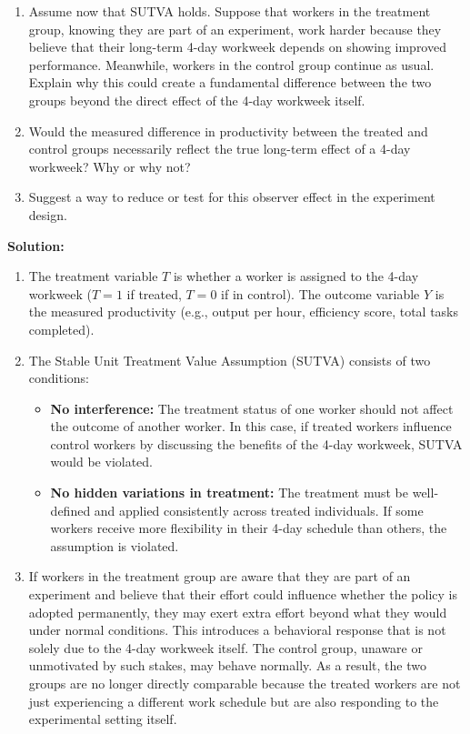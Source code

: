 \documentclass[12pt]{article}
\newif\ifsolutions
\begin{document}
\begin{enumerate}
\begin{enumerate}[label=(\alph*)]
    \item Assume now that SUTVA holds. Suppose that workers in the treatment group, knowing they are part of an experiment, work harder because they believe that their long-term 4-day workweek depends on showing improved performance. Meanwhile, workers in the control group continue as usual. Explain why this could create a fundamental difference between the two groups beyond the direct effect of the 4-day workweek itself.
    
    \item Would the measured difference in productivity between the treated and control groups necessarily reflect the true long-term effect of a 4-day workweek? Why or why not?
    
    \item Suggest a way to reduce or test for this observer effect in the experiment design.
\end{enumerate}

\ifsolutions \color{blue} \textbf{Solution:}  

\begin{enumerate}[label=(\alph*)]  

    \item The treatment variable \( T \) is whether a worker is assigned to the 4-day workweek (\( T = 1 \) if treated, \( T = 0 \) if in control).  
    The outcome variable \( Y \) is the measured productivity (e.g., output per hour, efficiency score, total tasks completed).  

    \item The Stable Unit Treatment Value Assumption (SUTVA) consists of two conditions:  
    \begin{itemize}  
        \item \textbf{No interference:} The treatment status of one worker should not affect the outcome of another worker. In this case, if treated workers influence control workers by discussing the benefits of the 4-day workweek, SUTVA would be violated.
        \item \textbf{No hidden variations in treatment:} The treatment must be well-defined and applied consistently across treated individuals. If some workers receive more flexibility in their 4-day schedule than others, the assumption is violated.  
    \end{itemize}  

    \item If workers in the treatment group are aware that they are part of an experiment and believe that their effort could influence whether the policy is adopted permanently, they may exert extra effort beyond what they would under normal conditions. This introduces a behavioral response that is not solely due to the 4-day workweek itself. The control group, unaware or unmotivated by such stakes, may behave normally. As a result, the two groups are no longer directly comparable because the treated workers are not just experiencing a different work schedule but are also responding to the experimental setting itself.


\end{enumerate}
\end{enumerate}
\end{document}
